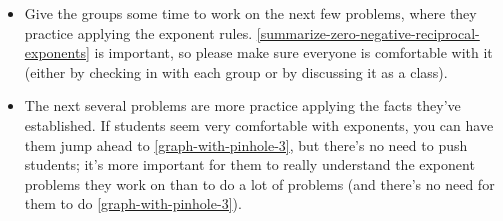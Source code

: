 \documentclass{article}
\begin{document}
\begin{workshop}
\begin{itemize}
    Some students may have trouble seeing how to apply a rule about $(ab)^n$ to something like $(a^2 b^6)^5$, so I like to describe the rule about $(ab)^n$ as telling us what happens when we raise a product to a power.

  \item Give the groups some time to work on the next few problems, where they practice applying the exponent rules. \ref{summarize-zero-negative-reciprocal-exponents} is important, so please make sure everyone is comfortable with it (either by checking in with each group or by discussing it as a class). 

  \item The next several problems are more practice applying the facts they've established. If students seem very comfortable with exponents, you can have them jump ahead to \ref{graph-with-pinhole-3}, but there's no need to push students; it's more important for them to really understand the exponent problems they work on than to do a lot of problems (and there's no need for them to do \ref{graph-with-pinhole-3}). 

  \end{itemize}
\end{workshop}
\end{document}
